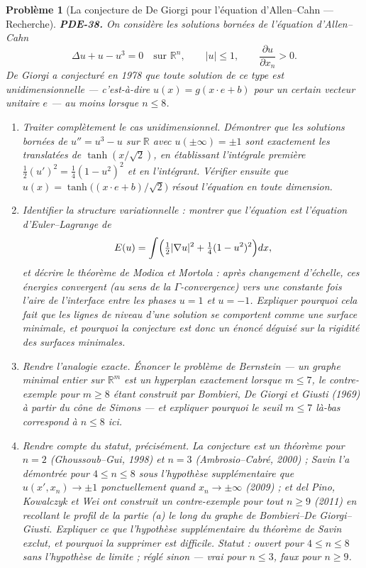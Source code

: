 \documentclass[11pt]{article}
\newtheorem{problem}{Problème}
\begin{document}
\begin{problem}[{La conjecture de De Giorgi pour l'équation d'Allen--Cahn --- Recherche}]
\textbf{PDE-38.} On considère les solutions bornées de l'équation d'Allen--Cahn
\[ \Delta u + u - u^3 = 0 \quad \text{sur } \mathbb{R}^n, \qquad |u| \le 1, \qquad
\frac{\partial u}{\partial x_n} > 0 . \]
De Giorgi a conjecturé en 1978 que toute solution de ce type est unidimensionnelle --- c'est-à-dire
$u(x) = g(x \cdot e + b)$ pour un certain vecteur unitaire $e$ --- au moins lorsque
$n \le 8$.
\begin{enumerate}
\item[(a)] Traiter complètement le cas unidimensionnel. Démontrer que les solutions bornées de
$u'' = u^3 - u$ sur $\mathbb{R}$ avec $u(\pm\infty) = \pm 1$ sont exactement les translatées
de $\tanh(x/\sqrt{2})$, en établissant l'intégrale première
$\tfrac{1}{2}(u')^2 = \tfrac{1}{4}(1-u^2)^2$ et en l'intégrant. Vérifier ensuite que
$u(x) = \tanh\bigl((x\cdot e + b)/\sqrt{2}\bigr)$ résout l'équation en toute
dimension.
\item[(b)] Identifier la structure variationnelle : montrer que l'équation est l'équation
d'Euler--Lagrange de
\[ E(u) = \int \Bigl( \tfrac{1}{2}|\nabla u|^2 + \tfrac{1}{4}(1-u^2)^2 \Bigr) dx , \]
et décrire le théorème de Modica et Mortola : après changement d'échelle, ces énergies convergent
(au sens de la $\Gamma$-convergence) vers une constante fois l'aire de l'interface entre les
phases $u = 1$ et $u = -1$. Expliquer pourquoi cela fait que les lignes de niveau d'une
solution se comportent comme une surface minimale, et pourquoi la conjecture est donc un énoncé
déguisé sur la rigidité des surfaces minimales.
\item[(c)] Rendre l'analogie exacte. Énoncer le problème de Bernstein --- un graphe minimal entier sur
$\mathbb{R}^m$ est un hyperplan exactement lorsque $m \le 7$, le contre-exemple pour
$m \ge 8$ étant construit par Bombieri, De Giorgi et Giusti (1969) à partir du cône de Simons ---
et expliquer pourquoi le seuil $m \le 7$ là-bas correspond à $n \le 8$ ici.
\item[(d)] Rendre compte du statut, précisément. La conjecture est un théorème pour $n = 2$
(Ghoussoub--Gui, 1998) et $n = 3$ (Ambrosio--Cabré, 2000) ; Savin l'a démontrée pour
$4 \le n \le 8$ sous l'hypothèse supplémentaire que $u(x', x_n) \to \pm 1$ ponctuellement quand
$x_n \to \pm\infty$ (2009) ; et del Pino, Kowalczyk et Wei ont construit un contre-exemple pour
tout $n \ge 9$ (2011) en recollant le profil de la partie (a) le long du graphe de
Bombieri--De Giorgi--Giusti. Expliquer ce que l'hypothèse supplémentaire du théorème de Savin exclut,
et pourquoi la supprimer est difficile.
\textit{Statut : ouvert pour $4 \le n \le 8$ sans l'hypothèse de limite ; réglé sinon --- vrai pour
$n \le 3$, faux pour $n \ge 9$.}
\end{enumerate}

\end{problem}
\end{document}
